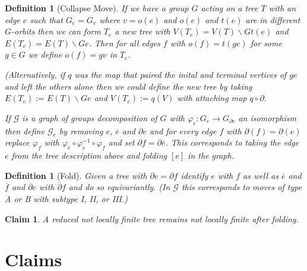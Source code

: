 \documentclass{article}
\theoremstyle{mystyle}
\newtheorem{defn}[lem]{Definition}
\newtheorem*{claim*}{Claim}
\theoremstyle{remark}
\begin{document}
\begin{defn}[Collapse Move]
	If we have a group \(G\) acting on a tree \(T\) with an edge \(e\) such that \(G_{e} = G_{v}\) where \(v=o(e)\) and \(o(e)\) and \(t(e)\) are in different \(G\)-orbits then we can form \(T_{e}\) a new tree with \(V(T_{e} )=V(T)\smallsetminus G t(e)\) and \(E(T_{e} )=E(T) \smallsetminus Ge\). Then for all edges \(f\) with \(o(f) = t(ge)\) for some \(g \in G\) we define \(o(f)=gv\) in \(T_{e}\). 
	
	(Alternatively, if \(q\) was the map that paired the inital and terminal vertices of \(g e\) and left the others alone then we could define the new tree by taking \(E(T_{e} ):=E(T)\smallsetminus Ge \) and \(V(T_{e} ):=q(V)\) with attaching map \(q \circ \partial\).

	If \(\mathcal{G}\) is a graph of groups decomposition of \(G\) with \(\varphi_{e}: G_{e} \to G_{\partial e}\) an isomorphism then define \(\mathcal{G}_{e}\) by removing \(e\), \(\overline{e}\) and \(\partial e\) and for every edge \(f\) with \(\partial(f) = \partial(e)\) replace \(\varphi_{f}\) with \(\varphi_{\overline{e}} \circ \varphi_{e}^{-1} \circ \varphi_{f}\) and set \(\partial f = \partial \overline{e}\). This corresponds to taking the edge \(e\) from the tree description above and folding \([e]\) in the graph.

\end{defn}
\begin{defn}[Fold]
	Given a tree with \(\partial e = \partial f\) identify \(e\) with \(f\) as well as \(\overline{e}\) and \(\overline{f}\) and \(\overline{\partial} e\) with \(\overline{\partial} f\) and do so equivariantly. (In \(\mathcal{G}\) this corresponds to moves of type A or B with subtype I, II, or III.)
\end{defn}

\begin{claim*} A reduced not locally finite tree remains not locally finite after folding.
\end{claim*}

\hrulefill

\section{Claims}
\end{document}

